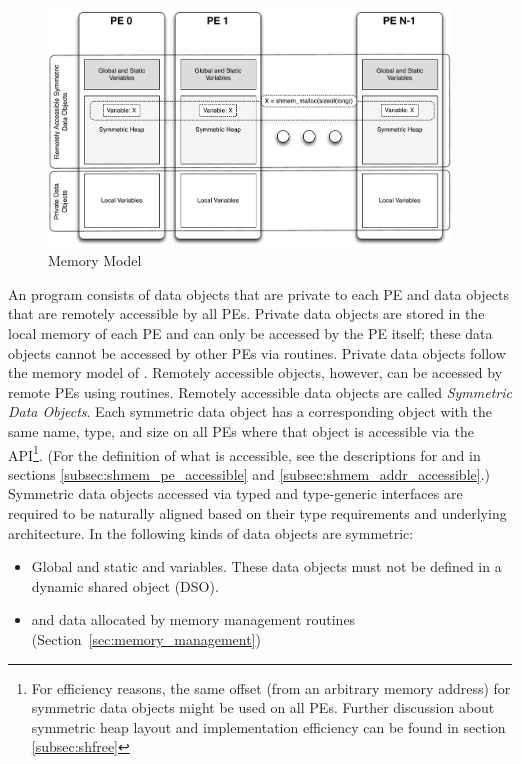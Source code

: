 \begin{figure}[h]
\includegraphics[width=0.95\textwidth]{figures/mem_model}
\caption{\openshmem Memory Model}
\label{fig:mem_model}
\end{figure}
%
An \openshmem program consists of data objects that are private to each \ac{PE}
and data  objects that are remotely accessible by all \acp{PE}. Private data
objects are stored in the local memory of each \ac{PE} and can only be accessed
by the \ac{PE} itself; these data objects cannot be accessed by other \acp{PE}
via \openshmem routines. Private data objects follow the memory model of
\Cstd. Remotely accessible objects, however, can be accessed by
remote \acp{PE} using \openshmem routines.  Remotely accessible data objects are
called \emph{Symmetric Data Objects}.  Each symmetric data object has a
corresponding object with the same name, type, and size on all \acp{PE} where that object is
accessible via the \openshmem \ac{API}\footnote{For efficiency reasons,
the same offset (from an arbitrary memory address) for symmetric data
objects might be used on all \acp{PE}. Further discussion about symmetric heap
layout and implementation efficiency can be found in section
\ref{subsec:shfree}}.  (For the definition of what is accessible, see the
descriptions for  and 
in sections \ref{subsec:shmem_pe_accessible} and
\ref{subsec:shmem_addr_accessible}.) Symmetric data objects accessed via typed and
type-generic \openshmem interfaces are required to be naturally aligned based on their type
requirements and underlying architecture.  In \openshmem the following kinds of
data objects are symmetric:
%
\begin{itemize}
\item Global and static \Cstd and \Cpp variables. These data objects must
  not be defined in a dynamic shared object (DSO).
\item \Cstd and \Cpp data allocated by \openshmem memory management routines
  (Section~\ref{sec:memory_management})
\end{itemize}


